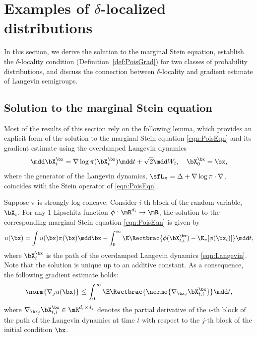 \documentclass[11pt]{article}
\begin{document}
\section{Examples of \texorpdfstring{$\delta$}{delta}-localized distributions}
\label{sec:LocalDist}

In this section, we derive the solution to the marginal Stein equation, establish the $\delta$-locality condition (Definition~\ref{def:PoisGrad}) for two classes of probability distributions, and discuss the connection between $\delta$-locality and gradient estimate of Langevin semigroups.




\subsection{Solution to the marginal Stein equation}
\label{sec:SoluMarginal}

Most of the results of this section rely on the following lemma, which provides an explicit form of the solution to the marginal Stein equation \eqref{eqn:PoisEqn} and its gradient estimate using the overdamped Langevin dynamics
\begin{equation}
\label{eqn:Langevin}
    \mdd \bX_t^\bx = \nabla \log \pi(\bX_t^\bx ) \mdd t + \sqrt{2} \mdd W_t , \quad \bX_0^\bx = \bx,
\end{equation}
where the generator of the Langevin dynamics, $\sfL_\pi = \Delta + \nabla \log \pi \cdot \nabla$, coincides with the Stein operator of \eqref{eqn:PoisEqn}. 


\begin{lem}
\label{lem:ExpSolu}
Suppose $\pi$ is strongly log-concave. Consider $i$-th block of the random variable, $\bX_i$. For any $1$-Lipschitz function $\phi:\mR^{d_i} \to \mR$, the solution to the corresponding marginal Stein equation \eqref{eqn:PoisEqn} is given by
\begin{equation}
\label{eqn:Solu}
    u(\bx) =  \int u(\bx) \pi(\bx) \mdd \bx - \int_0^\infty \E \Rectbrac{ \phi(\bX_{t,i}^\bx) - \E_\pi[\phi(\bx_i)] } \mdd t,
\end{equation}
where $\bX_t^\bx $ is the path of the overdamped Langevin dynamics \eqref{eqn:Langevin}.
Note that the solution is unique up to an additive constant.
%
As a consequence, the following gradient estimate holds:
\begin{equation}
\label{eqn:GradCtrl}
    \norm{ \nabla_j u(\bx) } \le \int_0^\infty \E \Rectbrac{ \normo{ \nabla_{\bx_j} \bX_{t,i}^\bx } } \mdd t,
\end{equation}
where $\nabla_{\bx_j} \bX_{t,i}^\bx \in  \mR^{d_i\times d_j}$ denotes the partial derivative of the $i$-th block of the path of the Langevin dynamics at time $t$ with respect to the $j$-th block of the initial condition $\bx$.
\end{lem}
\end{document}
